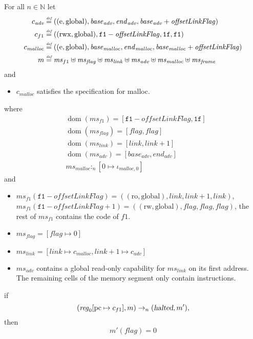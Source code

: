 \documentclass[a4paper]{article}
\newcommand{\forcenewline}{$\phantom{v}$\\}
\newcommand{\update}[2]{[#1 \mapsto #2]}
\newcommand{\defeq}{\stackrel{\textit{\tiny{def}}}{=}}
\DeclareMathOperator{\dom}{dom}
\newcommand{\var}[1]{\mathit{#1}}
\newcommand{\hs}{\var{ms}}
\newcommand{\ms}{\hs}
\newcommand{\pcreg}{\mathrm{pc}}
\newcommand{\start}{\var{base}}
\newcommand{\addrend}{\var{end}}
\newcommand{\reg}{\var{reg}}
\newcommand{\heap}{\var{mem}}
\newcommand{\adv}{\var{adv}}
\newcommand{\link}{\var{link}}
\newcommand{\flag}{\var{flag}}
\newcommand{\olf}{\var{offsetLinkFlag}}
\newcommand{\halted}{\textsl{halted}}
\newcommand{\heapSat}[3][\heap]{#1 :_{#2} #3}
\newcommand{\codelabel}[1]{\mathit{#1}}
\newcommand{\malloc}{\codelabel{malloc}}
\newcommand{\nats}{\mathbb{N}}
\newcommand{\plainperm}[1]{\mathrm{#1}}
\newcommand{\readonly}{\plainperm{ro}}
\newcommand{\readwrite}{\plainperm{rw}}
\newcommand{\entry}{\plainperm{e}}
\newcommand{\rwx}{\plainperm{rwx}}
\newcommand{\glob}{\plainperm{global}}
\newcommand{\step}[1][]{\rightarrow_{#1}}
\begin{document}
              \begin{lemma} \forcenewline
                \label{lem:correctness-f1}
                For all $n \in \nats$
                let
                \begin{align*}
                  c_{\var{adv}} & \defeq ((\entry,\glob),\start_{\adv},\addrend_{\adv},\start_{\adv}+\olf) \\
                  c_{f1} & \defeq ((\rwx,\glob),\mathtt{f1}-\olf,\mathtt{1f},\mathtt{f1}) \\
                  c_\malloc & \defeq ((\entry,\glob),\start_\malloc,\addrend_\malloc,\start_\malloc+\olf) \\
                  m & \defeq \hs_{f1} \uplus 
                      \hs_\flag \uplus                
                      \ms_{\var{link}} \uplus 
                      \hs_\adv \uplus 
                      \ms_{\malloc} \uplus 
                      \hs_{\var{frame}} 
                \end{align*}
                and
                \begin{itemize}
                \item $c_\malloc$ satisfies the specification for malloc.
                \end{itemize}
                where 
                \begin{align*}
                  &\dom(\hs_{f1}) = [\mathtt{f1}-\olf,\mathtt{1f}] \\
                  &\dom(\hs_\flag) = [\flag,\flag] \\
                  &\dom(\ms_\link) = [\link,\link+1]\\
                  &\dom(\hs_{\adv}) = [\start_\adv,\addrend_\adv] \\
                  &\heapSat[\hs_{\malloc}]{n}{[0 \mapsto \iota_{\malloc,0}]}
                \end{align*}
                and
                \begin{itemize}
                \item $\ms_{f1}(\mathtt{f1}-\olf) = ((\readonly,\glob),\link,\link+1,\link)$, $\ms_{f1}(\mathtt{f1}-\olf+1) = ((\readwrite,\glob),\flag,\flag,\flag)$, the rest of $\hs_{f1}$ contains the code of $f1$.
                \item $\ms_\flag = [\flag \mapsto 0]$
                \item $\ms_{\var{link}} = [\var{link} \mapsto c_\malloc, \var{link} + 1 \mapsto c_\adv]$
                \item $\hs_\adv$ contains a global read-only capability for $\hs_\link$ on its first address. The remaining cells of the memory segment only contain instructions.
                \end{itemize}
                if 
                \[
                  (\reg_0\update{\pcreg}{c_{f1}},m) \step[n] (\halted,m'),
                \]
                then
                \[
                  m'(\flag) = 0
                \]  
              \end{lemma}
\end{document}
